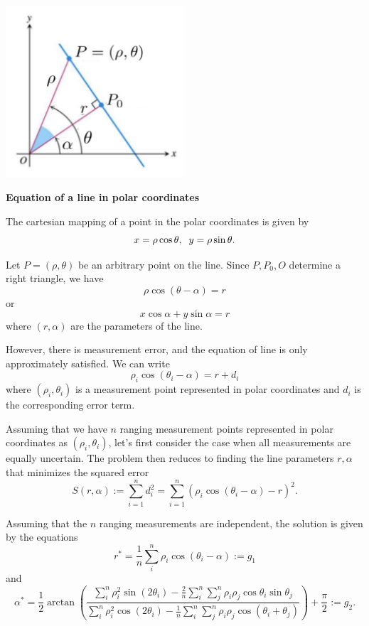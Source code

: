 \documentclass[twoside]{article}
\begin{document}
\begin{center}
	\includegraphics[width=0.5\textwidth]{PolarCoordinates}
\end{center}

\textbf{Equation of a line in polar coordinates} 

The cartesian mapping of a point in the polar coordinates is given by
$$x = \rho \cos \theta, \hspace{2mm} y = \rho \sin \theta.$$

Let $P = (\rho, \theta)$ be an arbitrary point on the line. Since $P, P_0, O$ determine a right triangle, we have
$$\rho \cos(\theta - \alpha) = r$$
or 
$$x \cos \alpha + y \sin \alpha = r$$
where $(r,\alpha)$ are the parameters of the line. 

However, there is measurement error, and the equation of line is only approximately satisfied. We can write 
$$\rho_i \cos(\theta_i - \alpha) = r + d_i$$
where $(\rho_i, \theta_i)$ is a measurement point represented in polar coordinates and $d_i$ is the corresponding error term. 

Assuming that we have $n$ ranging measurement points represented in polar coordinates as $(\rho_i, \theta_i)$, let's first consider the case when all measurements are equally uncertain. The problem then reduces to finding the line parameters $r,\alpha$ that minimizes the squared error
$$S(r,\alpha) := \sum_{i=1}^n d_i^2 = \sum_{i=1}^n(\rho_i \cos(\theta_i - \alpha) - r)^2.$$

Assuming that the $n$ ranging measurements are independent, the solution is given by the equations
$$r^* = \frac{1}{n}\sum_i^n \rho_i\cos(\theta_i - \alpha) := g_1$$ and
$$\alpha^* = \frac{1}{2} \arctan\left(\frac{\sum_i^n \rho_i^2\sin(2\theta_i) - \frac{2}{n}\sum_i^n\sum_j^n \rho_i \rho_j \cos\theta_i \sin \theta_j}{\sum_i^n \rho_i^2\cos(2\theta_i) - \frac{1}{n}\sum_i^n\sum_j^n \rho_i \rho_j \cos(\theta_i + \theta_j)}\right) + \frac{\pi}{2} := g_2.$$
\end{document}
